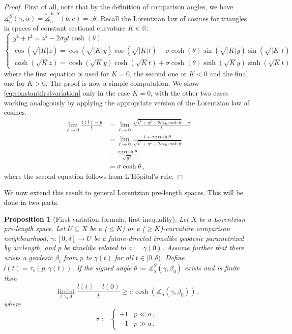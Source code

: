 \documentclass[11pt,reqno]{amsart}
\theoremstyle{definition}
\theoremstyle{definition}
\theoremstyle{plain}
\newtheorem{pop}[dfn]{Proposition}
\theoremstyle{remark}
\newcommand{\LpLSn}{Lorentzian pre-length space}
\newcommand{\ma}{\measuredangle}
\begin{document}
\begin{proof}
    First of all, note that by the definition of comparison angles, we have $\measuredangle^S_a(\gamma,\alpha)=\widetilde\measuredangle_a^{K,S}(b,c)=:\theta$. 
    Recall the Lorentzian law of cosines for triangles in spaces of constant sectional curvature $K\in\mathbb R$:
    \[\begin{cases}
        y^2+t^2=z^2-2\sigma yt\cosh(\theta) 
        \\
        \cos(\sqrt{|K|}z)=\cos(\sqrt{|K|}y)\cos(\sqrt{|K|}t)-\sigma\cosh(\theta)\sin(\sqrt{|K|}y)\sin(\sqrt{|K|}t) 
        \\
        \cosh(\sqrt{K}z)=\cosh(\sqrt{K}y)\cosh(\sqrt{K}t)+\sigma\cosh(\theta)\sinh(\sqrt{K}y)\sinh(\sqrt{K}t) 
    \end{cases}\]
    where the first equation is used for $K=0$, the second one or $K<0$ and the final one for $K>0$.
    The proof is now a simple computation. We show \eqref{eq:constantfirstvariation} only in the case $K=0$, with the other two cases working analogously by applying the appropriate version of the Lorentzian law of cosines.
    \begin{align*}
    \lim_{t\to0}\frac{z(t)-y}{t} 
    &=  \lim_{t\to0} \frac{\sqrt{t^2 +y^2+2\sigma ty\cosh{\theta}}-y}{t}\\
    &= \lim_{t\to0}\frac{t+ \sigma y\cosh\theta}{  \sqrt{t^2 +y^2+2\sigma t y \cosh{\theta}}}\\
    &=\frac{\sigma y \cosh\theta}{\sqrt{y^2}} \\
    &=\sigma \cosh\theta \, , 
    \end{align*}
    where the second equation follows from L'Hôpital's rule. 
    
\end{proof}
We now extend this result to general \LpLSn s. This will be done in two parts. 
\begin{pop}[First variation formula, first inequality]
\label{prop:geq}
Let $X$ be a \LpLSn. 
Let $U \subseteq X$ be a ($\leq K$) or a ($\geq K$)-curvature comparison neighbourhood, $\gamma:[0,\delta]\to U$ be a future-directed timelike geodesic parametrized by arclength, and $p$ be timelike related to $a:=\gamma(0)$. Assume further that there exists a geodesic $\beta_t$ from $p$ to $\gamma(t)$ for all $t\in [0,\delta)$. Define $l(t) = \tau_s(p,\gamma(t))$. If the signed angle $\theta:=\ma^S_a (\gamma,\beta_0)$ exists and is finite then
\[ \liminf_{t\searrow 0}\frac{l(t)-l(0)}{t} \geq \sigma\cosh(\ma_a(\gamma,\beta_0)) \, ,\]
where 
\[\sigma:=\begin{cases}
    +1 & p\ll a \, ,\\
    -1 & p\gg a \, .
\end{cases}\ \]
\end{pop}
\end{document}
